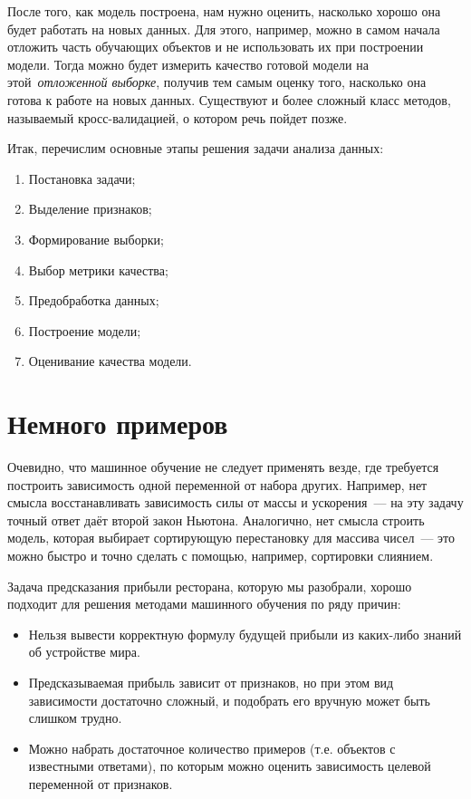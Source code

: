 \documentclass[12pt,fleqn]{article}
\begin{document}
После того, как модель построена, нам нужно оценить, насколько хорошо она
будет работать на новых данных.
Для этого, например, можно в самом начала отложить часть обучающих объектов
и не использовать их при построении модели.
Тогда можно будет измерить качество готовой модели на этой~\emph{отложенной выборке},
получив тем самым оценку того, насколько она готова к работе на новых данных.
Существуют и более сложный класс методов, называемый кросс-валидацией,
о котором речь пойдет позже.

Итак, перечислим основные этапы решения задачи анализа данных:
\begin{enumerate}
    \item Постановка задачи;
    \item Выделение признаков;
    \item Формирование выборки;
    \item Выбор метрики качества;
    \item Предобработка данных;
    \item Построение модели;
    \item Оценивание качества модели.
\end{enumerate}

\section{Немного примеров}

Очевидно, что машинное обучение не следует применять везде, где требуется построить
зависимость одной переменной от набора других.
Например, нет смысла восстанавливать зависимость силы от массы и ускорения~---
на эту задачу точный ответ даёт второй закон Ньютона.
Аналогично, нет смысла строить модель, которая выбирает сортирующую перестановку для массива чисел~---
это можно быстро и точно сделать с помощью, например, сортировки слиянием.

Задача предсказания прибыли ресторана, которую мы разобрали, хорошо подходит для решения
методами машинного обучения по ряду причин:
\begin{itemize}
    \item Нельзя вывести корректную формулу будущей прибыли из каких-либо знаний об устройстве мира.
    \item Предсказываемая прибыль зависит от признаков, но при этом вид зависимости достаточно сложный,
        и подобрать его вручную может быть слишком трудно.
    \item Можно набрать достаточное количество примеров (т.е. объектов с известными ответами),
        по которым можно оценить зависимость целевой переменной от признаков.
\end{itemize}
\end{document}
